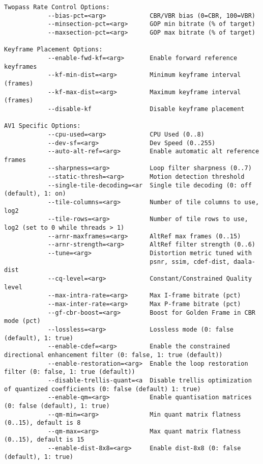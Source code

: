 \begin{appendices}
\begin{lstlisting}
Twopass Rate Control Options:
            --bias-pct=<arg>            CBR/VBR bias (0=CBR, 100=VBR)
            --minsection-pct=<arg>      GOP min bitrate (% of target)
            --maxsection-pct=<arg>      GOP max bitrate (% of target)

Keyframe Placement Options:
            --enable-fwd-kf=<arg>       Enable forward reference keyframes
            --kf-min-dist=<arg>         Minimum keyframe interval (frames)
            --kf-max-dist=<arg>         Maximum keyframe interval (frames)
            --disable-kf                Disable keyframe placement

AV1 Specific Options:
            --cpu-used=<arg>            CPU Used (0..8)
            --dev-sf=<arg>              Dev Speed (0..255)
            --auto-alt-ref=<arg>        Enable automatic alt reference frames
            --sharpness=<arg>           Loop filter sharpness (0..7)
            --static-thresh=<arg>       Motion detection threshold
            --single-tile-decoding=<ar  Single tile decoding (0: off (default), 1: on)
            --tile-columns=<arg>        Number of tile columns to use, log2
            --tile-rows=<arg>           Number of tile rows to use, log2 (set to 0 while threads > 1)
            --arnr-maxframes=<arg>      AltRef max frames (0..15)
            --arnr-strength=<arg>       AltRef filter strength (0..6)
            --tune=<arg>                Distortion metric tuned with
                                        psnr, ssim, cdef-dist, daala-dist
            --cq-level=<arg>            Constant/Constrained Quality level
            --max-intra-rate=<arg>      Max I-frame bitrate (pct)
            --max-inter-rate=<arg>      Max P-frame bitrate (pct)
            --gf-cbr-boost=<arg>        Boost for Golden Frame in CBR mode (pct)
            --lossless=<arg>            Lossless mode (0: false (default), 1: true)
            --enable-cdef=<arg>         Enable the constrained directional enhancement filter (0: false, 1: true (default))
            --enable-restoration=<arg>  Enable the loop restoration filter (0: false, 1: true (default))
            --disable-trellis-quant=<a  Disable trellis optimization of quantized coefficients (0: false (default) 1: true)
            --enable-qm=<arg>           Enable quantisation matrices (0: false (default), 1: true)
            --qm-min=<arg>              Min quant matrix flatness (0..15), default is 8
            --qm-max=<arg>              Max quant matrix flatness (0..15), default is 15
            --enable-dist-8x8=<arg>     Enable dist-8x8 (0: false (default), 1: true)

\end{lstlisting}
\end{appendices}
